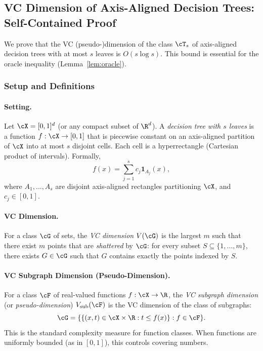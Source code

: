 
\subsection*{VC Dimension of Axis-Aligned Decision Trees: Self-Contained Proof}

We prove that the VC (pseudo-)dimension of the class $\cT_s$ of axis-aligned decision trees with at most $s$ leaves is $O(s \log s)$. This bound is essential for the oracle inequality (Lemma~\ref{lem:oracle}).

\subsubsection*{Setup and Definitions}

\paragraph{Setting.}
Let $\cX = [0,1]^d$ (or any compact subset of $\R^d$). A \emph{decision tree with $s$ leaves} is a function $f: \cX \to [0,1]$ that is piecewise constant on an axis-aligned partition of $\cX$ into at most $s$ disjoint cells. Each cell is a hyperrectangle (Cartesian product of intervals). Formally,
\[
f(x) = \sum_{j=1}^s c_j \mathbf{1}_{A_j}(x),
\]
where $A_1, \ldots, A_s$ are disjoint axis-aligned rectangles partitioning $\cX$, and $c_j \in [0,1]$.

\paragraph{VC Dimension.}
For a class $\cG$ of sets, the \emph{VC dimension} $V(\cG)$ is the largest $m$ such that there exist $m$ points that are \emph{shattered} by $\cG$: for every subset $S \subseteq \{1,\ldots,m\}$, there exists $G \in \cG$ such that $G$ contains exactly the points indexed by $S$.

\paragraph{VC Subgraph Dimension (Pseudo-Dimension).}
For a class $\cF$ of real-valued functions $f: \cX \to \R$, the \emph{VC subgraph dimension} (or \emph{pseudo-dimension}) $V_{\text{sub}}(\cF)$ is the VC dimension of the class of subgraphs:
\[
\cG = \{ \{ (x,t) \in \cX \times \R : t \le f(x) \} : f \in \cF \}.
\]
This is the standard complexity measure for function classes. When functions are uniformly bounded (as in $[0,1]$), this controls covering numbers.

